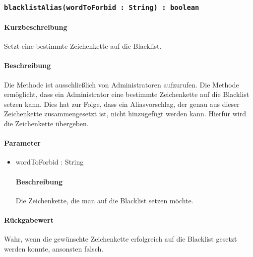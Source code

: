 \subsubsection{\texttt{blacklistAlias(wordToForbid : String) : boolean}}%
\paragraph*{Kurzbeschreibung}
Setzt eine bestimmte Zeichenkette auf die Blacklist.
\paragraph*{Beschreibung}
Die Methode ist ausschließlich von Administratoren aufzurufen.
Die Methode ermöglicht, dass ein Administrator eine bestimmte Zeichenkette auf die Blacklist setzen kann.
Dies hat zur Folge, dass ein Aliasvorschlag, der genau aus dieser Zeichenkette zusammengesetzt ist, nicht hinzugefügt werden kann.
Hierfür wird die Zeichenkette übergeben.
\paragraph*{Parameter}
\begin{itemize}
    \item wordToForbid : String
    		\paragraph*{Beschreibung}
    		Die Zeichenkette, die man auf die Blacklist setzen möchte.
\end{itemize}
\paragraph*{Rückgabewert}
Wahr, wenn die gewünschte Zeichenkette erfolgreich auf die Blacklist gesetzt werden konnte, ansonsten falsch.
